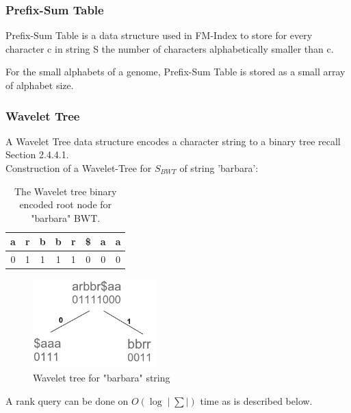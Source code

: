 \documentclass[11pt,a4paper]{report}
\begin{document}
\subsubsection{Prefix-Sum Table} \label{Prefix-Sum Table}
Prefix-Sum Table is a data structure used in FM-Index to store for every 
character c in string S the number of characters alphabetically smaller than c.

For the small alphabets of a genome, Prefix-Sum Table is stored
as a small array of alphabet size.

\subsubsection{Wavelet Tree}  \label{Wavelet Tree}
A Wavelet Tree data structure encodes a character string to a
binary tree recall Section 2.4.4.1.\\

Construction of a Wavelet-Tree for $ S_{BWT} $ of string 'barbara':

\begin{table}[h]
\centering
  \begin{tabular}{ c c c c c c c c}
   a  & r & b & b & r & \$ & a & a \\ 
  \hline
   0 &	1 &	1 & 1 & 1 & 0 & 0 & 0\\  
  \hline
  \end{tabular}
\caption{The Wavelet tree binary encoded root node for "barbara" BWT.}
\label{wavlet-binary-barbara}
\end{table}


\begin{figure}[H]
\centering
\includegraphics[width=4.75cm]{pictures/WavletBarbara.png}
\caption{Wavelet tree for "barbara" string }
\label{Wavlet-barbara}
\end{figure}


A rank query can be done on  $O(\log{}\mid\sum\mid)$ time as is described below.
\end{document}
